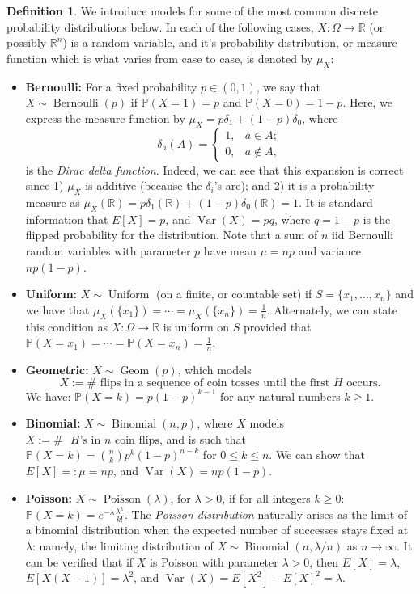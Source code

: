 \documentclass[12pt,reqno]{article}
\renewcommand{\emph}[1]{\textit{#1}}
\theoremstyle{plain}
\theoremstyle{definition}
\newtheorem{definition}[theorem]{Definition}
\newcommand{\PP}[1]{\ensuremath{\mathbb{P}\left(#1\right)}}
\begin{document}
\begin{definition}
We introduce models for some of the most common discrete probability distributions 
below. In each of the following cases, $X: \Omega \rightarrow \mathbb{R}$ (or 
possibly $\mathbb{R}^n$) is a random variable, and it's probability 
distribution, or measure function which is what varies from case to case, 
is denoted by $\mu_X$: 
\begin{itemize} 

\item \textbf{Bernoulli:} For a fixed probability $p \in (0, 1)$, we say that 
     $X \sim \operatorname{Bernoulli}(p)$ if $\PP{X = 1} = p$ and $\PP{X = 0} = 1-p$. 
     Here, we express the measure function by $\mu_X = p\delta_1 + (1-p)\delta_0$, where 
     $$\delta_a(A) = \begin{cases} 1, & a \in A; \\ 0, & a \notin A, \end{cases}$$ is 
     the \emph{Dirac delta function}. Indeed, we can see that this expansion is 
     correct since 1) $\mu_X$ is additive (because the $\delta_i$'s are); and 
     2) it is a probability measure as 
     $\mu_X(\mathbb{R}) = p \delta_1(\mathbb{R}) + (1-p) \delta_0(\mathbb{R}) = 1$. 
     It is standard information that $E[X] = p$, and $\operatorname{Var}(X) = pq$, where 
     $q = 1-p$ is the flipped probability for the distribution. 
     Note that a sum of $n$ iid Bernoulli random variables with parameter 
     $p$ have mean $\mu = np$ and variance $np(1-p)$. 
\item \textbf{Uniform:} $X \sim \operatorname{Uniform}$ (on a finite, or countable set) 
     if $S = \{x_1,\ldots,x_n\}$ and we have that $\mu_X(\{x_1\}) = \cdots = \mu_X(\{x_n\}) = \frac{1}{n}$. 
     Alternately, we can state this condition as $X: \Omega \rightarrow \mathbb{R}$ is uniform on $S$ 
     provided that $\PP{X = x_1} = \cdots = \PP{X = x_n} = \frac{1}{n}$. 
\item \textbf{Geometric:} $X \sim \operatorname{Geom}(p)$, which models 
     $$X := \#\text{ flips in a sequence of coin tosses until the first $H$ occurs}.$$ 
     We have: $\PP{X = k} = p(1-p)^{k-1}$ for any natural numbers $k \geq 1$. 
\item \textbf{Binomial:} $X \sim \operatorname{Binomial}(n, p)$, where $X$ models 
     $X := \#\text{ $H$'s in $n$ coin flips}$, and is such that 
     $\PP{X = k} = \binom{n}{k} p^k(1-p)^{n-k}$ for $0 \leq k \leq n$. 
     We can show that $E[X] =: \mu = np$, and 
     $\operatorname{Var}(X) = np(1-p)$. 
\item \textbf{Poisson:} $X \sim \operatorname{Poisson}(\lambda)$, for $\lambda > 0$, if 
     for all integers $k \geq 0$: $\PP{X = k} = e^{-\lambda} \frac{\lambda^k}{k!}$. The 
     \emph{Poisson distribution} naturally arises as the limit of a 
     binomial distribution when the expected number of successes stays 
     fixed at $\lambda$: namely, the limiting distribution of 
     $X \sim \operatorname{Binomial}(n, \lambda / n)$ as 
     $n \rightarrow \infty$. It can be verified that if $X$ is 
     Poisson with parameter $\lambda > 0$, then 
     $E[X] = \lambda$, $E[X(X-1)] = \lambda^2$, and 
     $\operatorname{Var}(X) = E[X^2]-E[X]^2 = \lambda$. 


\end{itemize}
\end{definition}
\end{document}
